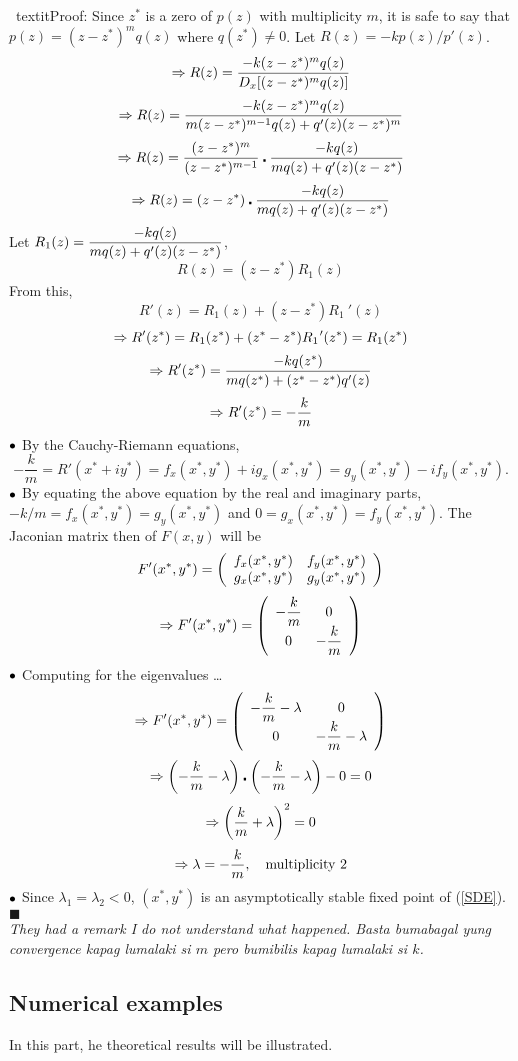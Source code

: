 \
textit{Proof:}
Since $z^*$ is a zero of $p(z)$ with multiplicity $m$, it is safe to say that $p(z) = (z-z^*)^m q(z)$ where $q(z^*)\neq0$. Let $R(z) = -kp(z)/p'(z)$.
$$\Rightarrow R(z) = \frac{-k(z-z^*)^m q(z)}{D_x[(z-z^*)^m q(z)]}$$
$$\Rightarrow R(z) = \frac{-k(z-z^*)^m q(z)}{m(z-z^*)^{m-1}q(z) + q'(z)(z-z^*)^m}$$
$$\Rightarrow R(z) = \frac{(z-z^*)^m}{(z-z^*)^{m-1}}\centerdot\frac{-kq(z)}{mq(z) + q'(z)(z-z^*)}$$
$$\Rightarrow R(z) = (z-z^*)\centerdot\frac{-kq(z)}{mq(z) + q'(z)(z-z^*)}$$
Let $R_1(z) = \displaystyle\frac{-kq(z)}{mq(z) + q'(z)(z-z^*)}$,
$$R(z) = (z-z^*)R_1(z)$$
From this,
$$R'(z) = R_1(z) + (z-z^*)R_1\:\!'(z)$$
$$\Rightarrow R'(z^*) = R_1(z^*) + (z^*-z^*)R_1\:\!'(z^*) = R_1(z^*)$$
$$\Rightarrow R'(z^*) = \frac{-kq(z^*)}{mq(z^*) + (z^*-z^*)q'(z)}$$
$$\Rightarrow R'(z^*) = -\frac{k}{m}$$
$\bullet$ By the Cauchy-Riemann equations,
$$-\frac{k}{m} = R'(x^*+iy^*) = f_x(x^*,y^*) + ig_x(x^*,y^*) = g_y(x^*,y^*) - if_y(x^*,y^*).$$
$\bullet$ By equating the above equation by the real and imaginary parts, $-k/m = f_x(x^*,y^*) = g_y(x^*,y^*)$ and $0 = g_x(x^*,y^*) = f_y(x^*,y^*)$. The Jaconian matrix then of $F(x,y)$ will be
$$F'(x^*,y^*) = \left(\begin{array}{c c}	f_x(x^*,y^*) & f_y(x^*,y^*)\\	g_x(x^*,y^*) & g_y(x^*,y^*)	\end{array}\right)$$
$$\Rightarrow F'(x^*,y^*) = \left(\begin{array}{c c}	-\displaystyle\frac{k}{m} & 0\\	0 & -\displaystyle\frac{k}{m}	\end{array}\right)$$
$\bullet$ Computing for the eigenvalues \dots
$$\Rightarrow F'(x^*,y^*) = \left(\begin{array}{c c}	-\displaystyle\frac{k}{m}-\lambda & 0\\	0 & -\displaystyle\frac{k}{m}-\lambda	\end{array}\right)$$
$$\Rightarrow \left(-\displaystyle\frac{k}{m}-\lambda\right)\centerdot\left(-\displaystyle\frac{k}{m}-\lambda \right)-0 = 0$$
$$\Rightarrow \left(\displaystyle\frac{k}{m}+\lambda\right)^2 = 0$$
$$\Rightarrow \lambda = -\frac{k}{m},\quad\textrm{multiplicity 2}$$
$\bullet$ Since $\lambda_1 = \lambda_2 < 0$, $(x^*,y^*)$ is an asymptotically stable fixed point of (\ref{SDE}).
\phantom{a}\hfill$\blacksquare$
\\

\textit{They had a remark I do not understand what happened. Basta bumabagal yung convergence kapag lumalaki si $m$ pero bumibilis kapag lumalaki si $k$.}\\

\subsection{Numerical examples}

In this part, he theoretical results will be illustrated.